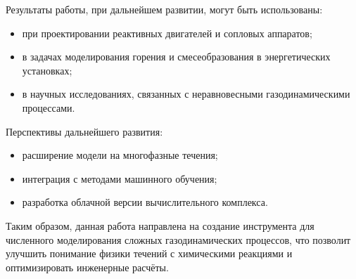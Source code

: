 Результаты работы, при дальнейшем развитии, могут быть использованы:

\begin{itemize}
    \item при проектировании реактивных двигателей и сопловых аппаратов;
    \item в задачах моделирования горения и смесеобразования в энергетических установках;
    \item в научных исследованиях, связанных с неравновесными газодинамическими процессами.
\end{itemize}

Перспективы дальнейшего развития:

\begin{itemize}
\item расширение модели на многофазные течения;
\item интеграция с методами машинного обучения;
\item разработка облачной версии вычислительного комплекса.
\end{itemize}

Таким образом, данная работа направлена на создание инструмента для численного моделирования сложных газодинамических процессов, что позволит улучшить понимание физики течений с химическими реакциями и оптимизировать инженерные расчёты.
